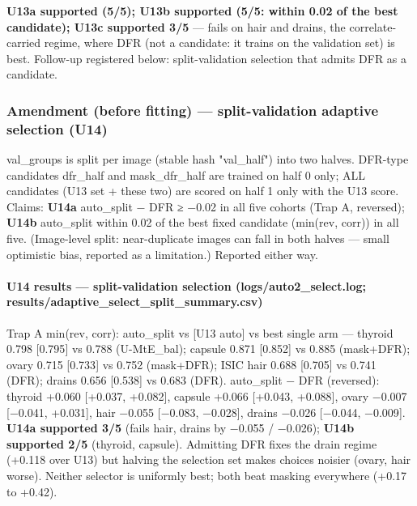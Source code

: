 {\textbf{U13a supported (5/5); U13b supported (5/5: within 0.02 of the best candidate); U13c supported 3/5} --- fails on
hair and drains, the correlate-carried regime, where DFR (not a candidate: it trains on the validation set) is best.
Follow-up registered below: split-validation selection that admits DFR as a candidate.

\subsubsection{Amendment (before fitting) --- split-validation adaptive selection (U14)}\label{amendment-before-fitting--split-validation-adaptive-selection-u14}

val\_groups is split per image (stable hash "val\_half") into two halves. DFR-type candidates dfr\_half and
mask\_dfr\_half are trained on half 0 only; ALL candidates (U13 set + these two) are scored on half 1 only with the
U13 score. Claims: \textbf{U14a} auto\_split − DFR ≥ −0.02 in all five cohorts (Trap A, reversed); \textbf{U14b} auto\_split
within 0.02 of the best fixed candidate (min(rev, corr)) in all five. (Image-level split: near-duplicate images can
fall in both halves --- small optimistic bias, reported as a limitation.) Reported either way.

\paragraph{U14 results --- split-validation selection (logs/auto2\_select.log; results/adaptive\_select\_split\_summary.csv)}\label{u14-results--split-validation-selection-logsauto2_selectlog-resultsadaptive_select_split_summarycsv}

Trap A min(rev, corr): auto\_split vs {[}U13 auto{]} vs best single arm ---
thyroid 0.798 {[}0.795{]} vs 0.788 (U-MtE\_bal); capsule 0.871 {[}0.852{]} vs 0.885 (mask+DFR); ovary 0.715 {[}0.733{]} vs 0.752
(mask+DFR); ISIC hair 0.688 {[}0.705{]} vs 0.741 (DFR); drains 0.656 {[}0.538{]} vs 0.683 (DFR).
auto\_split − DFR (reversed): thyroid +0.060 {[}+0.037, +0.082{]}, capsule +0.066 {[}+0.043, +0.088{]}, ovary −0.007
{[}−0.041, +0.031{]}, hair −0.055 {[}−0.083, −0.028{]}, drains −0.026 {[}−0.044, −0.009{]}.
\textbf{U14a supported 3/5} (fails hair, drains by −0.055 / −0.026); \textbf{U14b supported 2/5} (thyroid, capsule).
Admitting DFR fixes the drain regime (+0.118 over U13) but halving the selection set makes choices noisier
(ovary, hair worse). Neither selector is uniformly best; both beat masking everywhere (+0.17 to +0.42).

}
